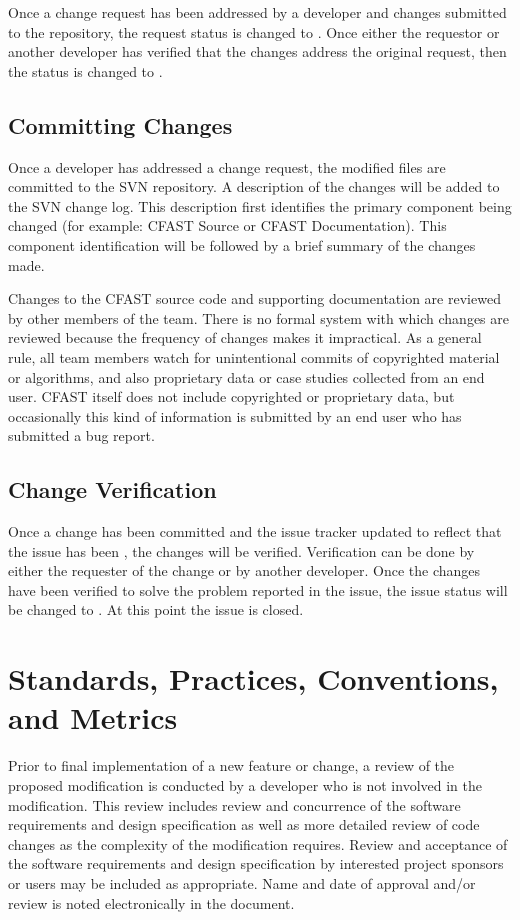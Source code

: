 Once a change request has been addressed by a developer and changes submitted to the repository, the request status is changed to .  Once either the requestor or another developer has verified that the changes address the original request, then the status is changed to .


\subsection{Committing Changes}

Once a developer has addressed a change request, the modified files are committed to the SVN repository.  A description of the changes will be added to the SVN change log.  This description first identifies the primary component being changed (for example: CFAST Source or CFAST Documentation).  This component identification will be followed by a brief summary of the changes made.

Changes to the CFAST source code and supporting documentation are reviewed by other members of the team. There is no formal system with which changes are reviewed because the frequency of changes makes it impractical. As a general rule, all team members watch for unintentional commits of copyrighted material or algorithms, and also proprietary data or case studies collected from an end user. CFAST itself does not include copyrighted or proprietary data, but occasionally this kind of information is submitted by an end user who has submitted a bug report.

\subsection{Change Verification}

Once a change has been committed and the issue tracker updated to reflect that the issue has been , the changes will be verified.  Verification can be done by either the requester of the change or by another developer.  Once the changes have been verified to solve the problem reported in the issue, the issue status will be changed to .  At this point the issue is closed.

\section{Standards, Practices, Conventions, and Metrics}

Prior to final implementation of a new feature or change, a review of the proposed modification is conducted by a developer who is not involved in the modification.  This review includes review and concurrence of the software requirements and design specification as well as more detailed review of code changes as the complexity of the modification requires. Review and acceptance of the software requirements and design specification by interested project sponsors or users may be included as appropriate. Name and date of approval and/or review is noted electronically in the document.

